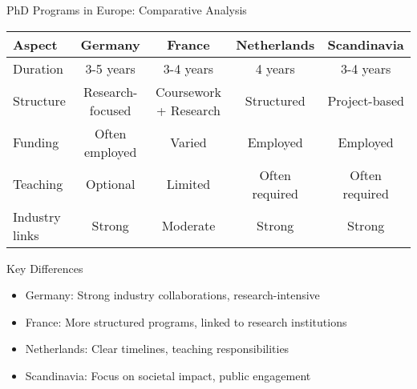 \documentclass[10pt]{beamer}
\begin{document}
\begin{frame}[fragile]{PhD Programs in Europe: Comparative Analysis}
\begin{tabular}{|l|c|c|c|c|}
\hline
\textbf{Aspect} & \textbf{Germany} & \textbf{France} & \textbf{Netherlands} & \textbf{Scandinavia} \\
\hline
Duration & 3-5 years & 3-4 years & 4 years & 3-4 years \\
\hline
Structure & Research-focused & Coursework + Research & Structured & Project-based \\
\hline
Funding & Often employed & Varied & Employed & Employed \\
\hline
Teaching & Optional & Limited & Often required & Often required \\
\hline
Industry links & Strong & Moderate & Strong & Strong \\
\hline
\end{tabular}

\vspace{0.5cm}
\alert{Key Differences}
\begin{itemize}
    \item Germany: Strong industry collaborations, research-intensive
    \item France: More structured programs, linked to research institutions
    \item Netherlands: Clear timelines, teaching responsibilities
    \item Scandinavia: Focus on societal impact, public engagement
\end{itemize}
\end{frame}
\end{document}
